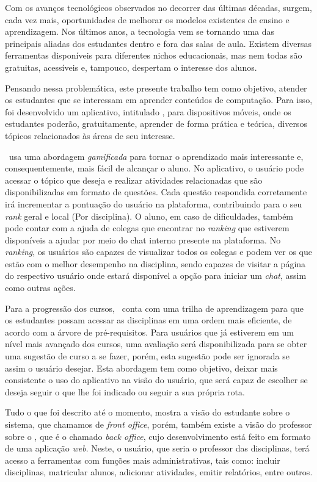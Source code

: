 Com os avanços tecnológicos observados no decorrer das últimas décadas, surgem, cada vez mais, oportunidades de melhorar os modelos existentes de ensino e aprendizagem. Nos últimos anos, a tecnologia vem se tornando uma das principais aliadas dos estudantes dentro e fora das salas de aula. Existem diversas ferramentas disponíveis para diferentes nichos educacionais, mas nem todas são gratuitas, acessíveis e, tampouco, despertam o interesse dos alunos.

Pensando nessa problemática, este presente trabalho tem como objetivo, atender os estudantes que se interessam em aprender conteúdos de computação. Para isso, foi desenvolvido um aplicativo, intitulado \appName, para dispositivos móveis, onde os estudantes poderão, gratuitamente, aprender de forma prática e teórica, diversos tópicos relacionados às áreas de seu interesse.

\appName\ usa uma abordagem \textit{gamificada} para tornar o aprendizado mais interessante e, consequentemente, mais fácil de alcançar o aluno. No aplicativo, o usuário pode acessar o tópico que deseja e realizar atividades relacionadas que são disponibilizadas em formato de questões. Cada questão respondida corretamente irá incrementar a pontuação do usuário na plataforma, contribuindo para o seu \textit{rank} geral e local (Por disciplina). O aluno, em caso de dificuldades, também pode contar com a ajuda de colegas que encontrar no \textit{ranking} que estiverem disponíveis a ajudar por meio do chat interno presente na plataforma. No \textit{ranking}, os usuários são capazes de visualizar todos os colegas e podem ver os que estão com o melhor desempenho na disciplina, sendo capazes de visitar a página do respectivo usuário onde estará disponível a opção para iniciar um \textit{chat}, assim como outras ações.

Para a progressão dos cursos, \appName\ conta com uma trilha de aprendizagem para que os estudantes possam acessar as disciplinas em uma ordem mais eficiente, de acordo com a árvore de pré-requisitos. Para usuários que já estiverem em um nível mais avançado dos cursos, uma avaliação será disponibilizada para se obter uma sugestão de curso a se fazer, porém, esta sugestão pode ser ignorada se assim o usuário desejar. Esta abordagem tem como objetivo, deixar mais consistente o uso do aplicativo na visão do usuário, que será capaz de escolher se deseja seguir o que lhe foi indicado ou seguir a sua própria rota.

Tudo o que foi descrito até o momento, mostra a visão do estudante sobre o sistema, que chamamos de \textit{front office}, porém, também existe a visão do professor sobre o \appName, que é o chamado \textit{back office}, cujo desenvolvimento está feito em formato de uma aplicação \textit{web}. Neste, o usuário, que seria o professor das disciplinas, terá acesso a ferramentas com funções mais administrativas, tais como: incluir disciplinas, matricular alunos, adicionar atividades, emitir relatórios, entre outros.
